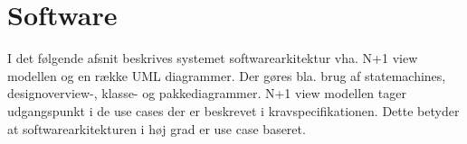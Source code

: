 \chapter{Software}

I det følgende afsnit beskrives systemet softwarearkitektur vha. N+1 view modellen og en række UML diagrammer. Der gøres bla. brug af statemachines, designoverview-, klasse- og pakkediagrammer. N+1 view modellen tager udgangspunkt i de use cases der er beskrevet i kravspecifikationen. Dette betyder at softwarearkitekturen i høj grad er use case baseret.



\newpage


\newpage


\newpage


\newpage


\newpage



%

\newpage


%

\newpage
